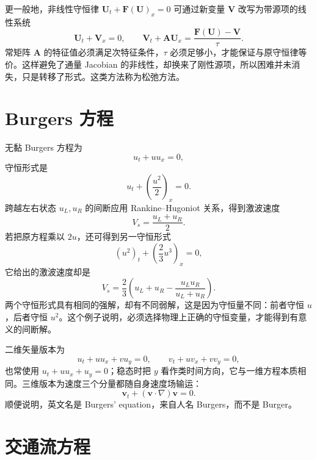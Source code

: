 \documentclass[11pt,a4paper,openany,fontset=none]{ctexbook}
\begin{document}
更一般地，非线性守恒律 $\bm U_t+\bm F(\bm U)_x=0$ 可通过新变量 $\bm V$ 改写为带源项的线性系统
\begin{equation}
 \bm U_t+\bm V_x=0,\qquad
 \bm V_t+\bm A\bm U_x=\frac{\bm F(\bm U)-\bm V}{\tau}. \tag{2.12.10--11}
\end{equation}
常矩阵 $\bm A$ 的特征值必须满足次特征条件，$\tau$ 必须足够小，才能保证与原守恒律等价。这样避免了通量 Jacobian 的非线性，却换来了刚性源项，所以困难并未消失，只是转移了形式。这类方法称为松弛方法。

\section{Burgers 方程}

无黏 Burgers 方程为
\begin{equation}
 u_t+u u_x=0, \tag{2.13.1}
\end{equation}
守恒形式是
\begin{equation}
 u_t+\left(\frac{u^2}{2}\right)_x=0. \tag{2.13.2}
\end{equation}
跨越左右状态 $u_L,u_R$ 的间断应用 Rankine--Hugoniot 关系，得到激波速度
\begin{equation}
 V_s=\frac{u_L+u_R}{2}. \tag{2.13.3}
\end{equation}
若把原方程乘以 $2u$，还可得到另一守恒形式
\begin{equation}
 (u^2)_t+\left(\frac23u^3\right)_x=0, \tag{2.13.4}
\end{equation}
它给出的激波速度却是
\begin{equation}
 V_s=\frac23\left(u_L+u_R-\frac{u_Lu_R}{u_L+u_R}\right). \tag{2.13.5}
\end{equation}
两个守恒形式具有相同的强解，却有不同弱解，这是因为守恒量不同：前者守恒 $u$，后者守恒 $u^2$。这个例子说明，必须选择物理上正确的守恒变量，才能得到有意义的间断解。

二维矢量版本为
\begin{equation}
 u_t+u u_x+v u_y=0,\qquad v_t+u v_x+v v_y=0, \tag{2.13.6--7}
\end{equation}
也常使用 $u_t+u u_x+u_y=0$；稳态时把 $y$ 看作类时间方向，它与一维方程本质相同。三维版本为速度三个分量都随自身速度场输运：
\begin{equation}
 \bm v_t+(\bm v\cdot\nabla)\bm v=0. \tag{2.13.9--11}
\end{equation}
顺便说明，英文名是 Burgers' equation，来自人名 Burgers，而不是 Burger。

\section{交通流方程}
\end{document}
